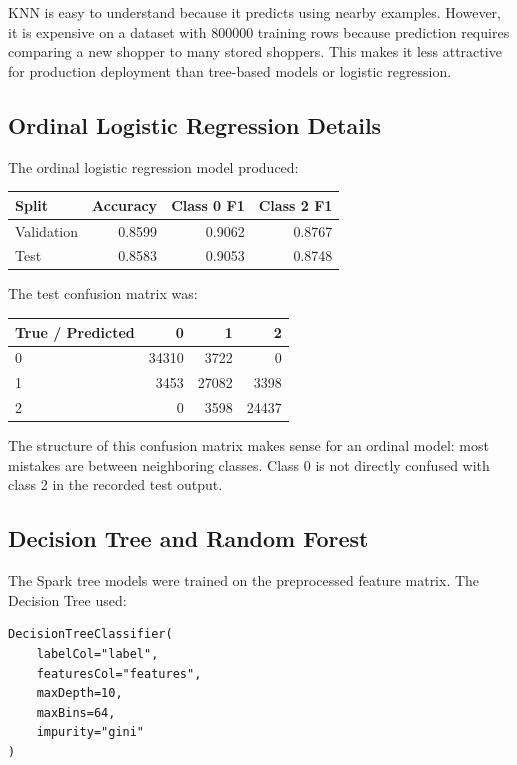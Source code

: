 \documentclass[11pt,a4paper]{article}
\begin{document}
KNN is easy to understand because it predicts using nearby examples. However, it is expensive on a dataset with 800000 training rows because prediction requires comparing a new shopper to many stored shoppers. This makes it less attractive for production deployment than tree-based models or logistic regression.

\subsection{Ordinal Logistic Regression Details}

The ordinal logistic regression model produced:
\begin{center}
\begin{tabular}{lrrr}
\toprule
Split & Accuracy & Class 0 F1 & Class 2 F1 \\
\midrule
Validation & 0.8599 & 0.9062 & 0.8767 \\
Test & 0.8583 & 0.9053 & 0.8748 \\
\bottomrule
\end{tabular}
\end{center}

The test confusion matrix was:
\begin{center}
\begin{tabular}{lrrr}
\toprule
True / Predicted & 0 & 1 & 2 \\
\midrule
0 & 34310 & 3722 & 0 \\
1 & 3453 & 27082 & 3398 \\
2 & 0 & 3598 & 24437 \\
\bottomrule
\end{tabular}
\end{center}

The structure of this confusion matrix makes sense for an ordinal model: most mistakes are between neighboring classes. Class 0 is not directly confused with class 2 in the recorded test output.

\subsection{Decision Tree and Random Forest}

The Spark tree models were trained on the preprocessed feature matrix. The Decision Tree used:
\begin{verbatim}
DecisionTreeClassifier(
    labelCol="label",
    featuresCol="features",
    maxDepth=10,
    maxBins=64,
    impurity="gini"
)
\end{verbatim}
\end{document}
